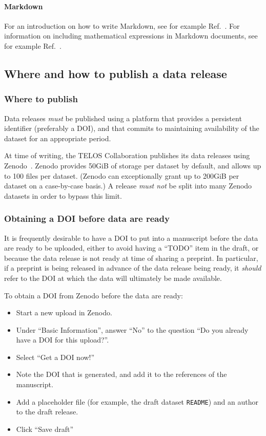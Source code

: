 \documentclass{article}
\newcommand\rfcword[1]{\emph{#1}\xspace}
\newcommand\must{\rfcword{must}}
\newcommand\mustnot{\rfcword{must not}}
\newcommand\should{\rfcword{should}}
\newcommand\filename[1]{\texttt{#1}\xspace}
\newcommand\readme{\filename{README}\xspace}
\begin{document}
\paragraph{Markdown}

For an introduction on how to write Markdown,
see for example Ref.~\cite{markdown-guide}.
For information on including mathematical expressions in Markdown documents,
see for example Ref.~\cite{github-markdown}.

\subsection{Where and how to publish a data release}\label{sec:publish-data}

\subsubsection{Where to publish}

Data releases \must be published using a platform that provides a persistent identifier
(preferably a DOI),
and that commits to maintaining availability of the dataset for an appropriate period.

At time of writing,
the TELOS Collaboration publishes its data releases using Zenodo~\cite{zenodo}.
Zenodo provides 50GiB of storage per dataset by default,
and allows up to 100 files per dataset.
(Zenodo can exceptionally grant up to 200GiB per dataset on a case-by-case basis.)
A release \mustnot be split into many Zenodo datasets in order to bypass this limit.

\subsubsection{Obtaining a DOI before data are ready}\label{sec:get-doi}

It is frequently desirable to have a DOI to put into a manuscript
before the data are ready to be uploaded,
either to avoid having a ``TODO'' item in the draft,
or because the data release is not ready at time of sharing a preprint.
In particular,
if a preprint is being released in advance of the data release being ready,
it \should refer to the DOI at which the data will ultimately be made available.

To obtain a DOI from Zenodo before the data are ready:

\begin{itemize}
  \item
        Start a new upload in Zenodo.
  \item
        Under ``Basic Information'', answer ``No'' to the question
        ``Do you already have a DOI for this upload?''.
  \item
        Select ``Get a DOI now!''
  \item
        Note the DOI that is generated,
        and add it to the references of the manuscript.
  \item
        Add a placeholder file
        (for example, the draft dataset \readme)
        and an author to the draft release.
  \item
        Click ``Save draft''
\end{itemize}
\end{document}
